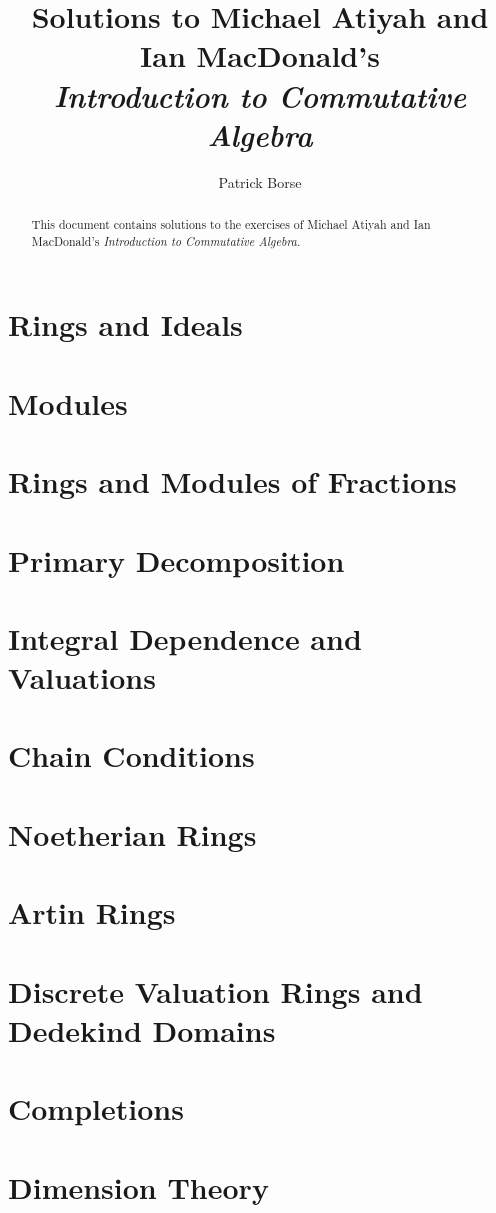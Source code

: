 \documentclass[oneside]{amsbook}
\title{Solutions to Michael Atiyah and Ian MacDonald's\\ \emph{Introduction to Commutative Algebra}}
\author{Patrick Borse}
\numberwithin{ex}{chapter}
\begin{document}
\begin{abstract}
This document contains solutions to the exercises of Michael Atiyah and Ian MacDonald's \emph{Introduction to Commutative Algebra}.
\end{abstract}

\maketitle

\tableofcontents

\chapter{Rings and Ideals}


\chapter{Modules}


\chapter{Rings and Modules of Fractions}


\chapter{Primary Decomposition}


\chapter{Integral Dependence and Valuations}


\chapter{Chain Conditions}


\chapter{Noetherian Rings}


\chapter{Artin Rings}


\chapter{Discrete Valuation Rings and Dedekind Domains}


\chapter{Completions}


\chapter{Dimension Theory}

\end{document}

